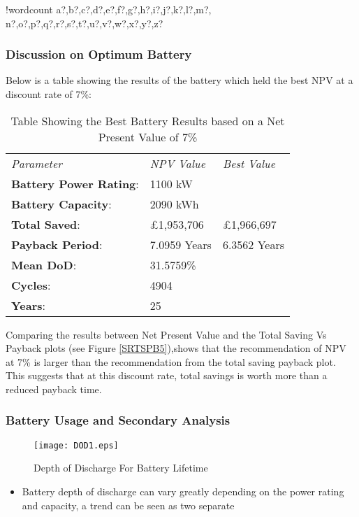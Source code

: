 \documentclass[fontsize=9.5pt]{extarticle}
\numberwithin{figure}{section} %
\providecommand{\tightlist}{%
  \setlength{\itemsep}{0pt}\setlength{\parskip}{0pt}}
\newcounter{words}
\newenvironment{counted}{%
  \setcounter{words}{0}
  \SearchList!{wordcount}{\stepcounter{words}}
    {a?,b?,c?,d?,e?,f?,g?,h?,i?,j?,k?,l?,m?,
    n?,o?,p?,q?,r?,s?,t?,u?,v?,w?,x?,y?,z?}
  \UndoBoundary{'}
  \SearchOrder{p;}}{%
  \StopSearching}
\begin{document}
\begin{counted}
\subsubsection{Discussion on Optimum
Battery}\label{discussion-on-optimum-battery}

Below is a table showing the results of the battery which held the best
NPV at a discount rate of 7\%:

\begin{table}[H]
\begin{tabular}{p{3.4cm}p{3cm}p{3cm}}
\textit{Parameter} & \textit{NPV Value} & \textit{Best Value}\\
\textbf{Battery Power Rating}:& 1100 kW\\
\textbf{Battery Capacity}:& 2090 kWh\\
\textbf{Total Saved}:& £1,953,706 & £1,966,697\\
\textbf{Payback Period}:& 7.0959 Years & 6.3562 Years\\
\textbf{Mean DoD}:& 31.5759\% \\
\textbf{Cycles}:& 4904\\
\textbf{Years}:& 25\\
\end{tabular}
\label{BestNPVTable}
\caption{Table Showing the Best Battery Results based on a Net Present Value of 7\%}
\end{table}

Comparing the results between Net Present Value and the Total Saving Vs
Payback plots (see Figure \ref{SRTSPB5}),shows that the recommendation
of NPV at 7\% is larger than the recommendation from the total saving
payback plot. This suggests that at this discount rate, total savings is
worth more than a reduced payback time.

\subsubsection{Battery Usage and Secondary
Analysis}\label{battery-usage-and-secondary-analysis}

\begin{figure}[H]
 \centering
 \texttt{[image: DOD1.eps]}
\caption{Depth of Discharge For Battery Lifetime}
 \label{DOD1}
 \end{figure}

\begin{itemize}
\tightlist
\item
  Battery depth of discharge can vary greatly depending on the power
  rating and capacity, a trend can be seen as two separate
\end{itemize}


\end{counted}
\end{document}
